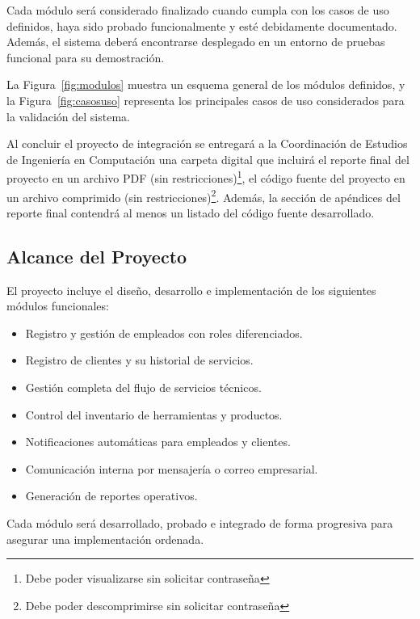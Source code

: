	Cada módulo será considerado finalizado cuando cumpla con los casos de uso definidos, haya sido probado funcionalmente y esté debidamente documentado. Además, el sistema deberá encontrarse desplegado en un entorno de pruebas funcional para su demostración.
	
	La Figura~\ref{fig:modulos} muestra un esquema general de los módulos definidos, y la Figura~\ref{fig:casosuso} representa los principales casos de uso considerados para la validación del sistema.
	
	\vspace{0.5cm}
	
	Al concluir el proyecto de integración se entregará a la Coordinación de Estudios de Ingeniería en Computación una carpeta digital que incluirá el reporte final del proyecto en un archivo PDF (sin restricciones)\footnote{Debe poder visualizarse sin solicitar contraseña}, el código fuente del proyecto en un archivo comprimido (sin restricciones)\footnote{Debe poder descomprimirse sin solicitar contraseña}. Además, la sección de apéndices del reporte final contendrá al menos un listado del código fuente desarrollado.
	
\subsection{Alcance del Proyecto}

El proyecto incluye el diseño, desarrollo e implementación de los siguientes módulos funcionales:

\begin{itemize}
	\item Registro y gestión de empleados con roles diferenciados.
	\item Registro de clientes y su historial de servicios.
	\item Gestión completa del flujo de servicios técnicos.
	\item Control del inventario de herramientas y productos.
	\item Notificaciones automáticas para empleados y clientes.
	\item Comunicación interna por mensajería o correo empresarial.
	\item Generación de reportes operativos.
\end{itemize}

Cada módulo será desarrollado, probado e integrado de forma progresiva para asegurar una implementación ordenada.


